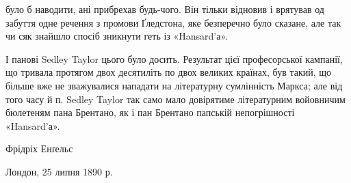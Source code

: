 було б наводити, ані прибрехав будь-чого. Він тільки відновив
і врятував од забуття одне речення з промови Ґледстона, яке безперечно
було сказане, але так чи сяк знайшло спосіб зникнути
геть із «Hansard’а».

І панові Sedley Taylor цього було досить. Результат цієї професорської
кампанії, що тривала протягом двох десятиліть
по двох великих країнах, був такий, що більше вже не зважувалися
нападати на літературну сумлінність Маркса; але від
того часу й п. Sedley Taylor так само мало довірятиме літературним
войовничим бюлетеням пана Брентано, як і пан Брентано
папській непогрішності «Hansard’а».

Фрідріх Енґельс

Лондон, 25 липня 1890 р.
